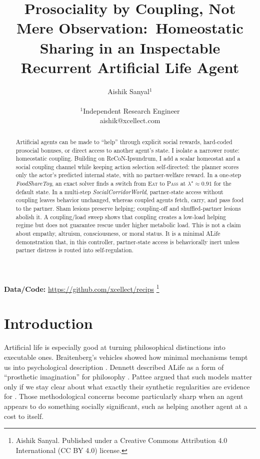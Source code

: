 \documentclass[letterpaper]{article}
\title{Prosociality by Coupling, Not Mere Observation:\
Homeostatic Sharing in an Inspectable Recurrent Artificial Life Agent}
\author{
Aishik Sanyal$^{1}$\\
\mbox{}\\
$^{1}$Independent Research Engineer\\
aishik@xcellect.com
}
\newcommand\blfootnote[1]{%
  \begingroup
  \renewcommand\thefootnote{}\footnote{#1}%
  \addtocounter{footnote}{-1}%
  \endgroup
}
\begin{document}
\maketitle

\begin{abstract}
Artificial agents can be made to ``help'' through explicit social rewards, hard-coded prosocial bonuses, or direct access to another agent's state. I isolate a narrower route: homeostatic coupling. Building on ReCoN-Ipsundrum, I add a scalar homeostat and a social coupling channel while keeping action selection self-directed: the planner scores only the actor's predicted internal state, with no partner-welfare reward. In a one-step \emph{FoodShareToy}, an exact solver finds a switch from \textsc{Eat} to \textsc{Pass} at $\lambda^\star \approx 0.91$ for the default state. In a multi-step \emph{SocialCorridorWorld}, partner-state access without coupling leaves behavior unchanged, whereas coupled agents fetch, carry, and pass food to the partner. Sham lesions preserve helping; coupling-off and shuffled-partner lesions abolish it. A coupling/load sweep shows that coupling creates a low-load helping regime but does not guarantee rescue under higher metabolic load. This is not a claim about empathy, altruism, consciousness, or moral status. It is a minimal ALife demonstration that, in this controller, partner-state access is behaviorally inert unless partner distress is routed into self-regulation.
\end{abstract}

\noindent\textbf{Data/Code:} \href{https://github.com/xcellect/recips}{https://github.com/xcellect/recips}
\blfootnote{\textcopyright  2026 Aishik Sanyal. Published under a Creative Commons Attribution 4.0 International (CC BY 4.0) license.}

\section{Introduction}

Artificial life is especially good at turning philosophical distinctions into executable ones. Braitenberg's vehicles showed how minimal mechanisms tempt us into psychological description \citep{Braitenberg1984Vehicles}. Dennett described ALife as a form of ``prosthetic imagination'' for philosophy \citep{Dennett1994ArtificialLifeAsPhilosophy}. Pattee argued that such models matter only if we stay clear about what exactly their synthetic regularities are evidence for \citep{Pattee1995Epistemology}. Those methodological concerns become particularly sharp when an agent appears to do something socially significant, such as helping another agent at a cost to itself.
\end{document}
